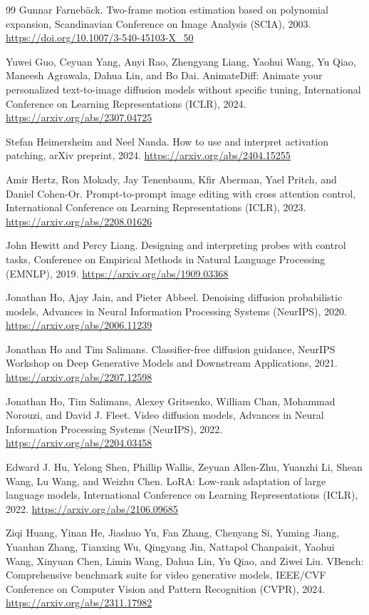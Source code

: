 \documentclass[twoside,english]{article}
\begin{document}
\begin{thebibliography}{99}
 Gunnar Farneb\"ack. Two-frame motion estimation based on polynomial expansion, Scandinavian Conference on Image Analysis (SCIA), 2003. \url{https://doi.org/10.1007/3-540-45103-X_50}

 Yuwei Guo, Ceyuan Yang, Anyi Rao, Zhengyang Liang, Yaohui Wang, Yu Qiao, Maneesh Agrawala, Dahua Lin, and Bo Dai. AnimateDiff: Animate your personalized text-to-image diffusion models without specific tuning, International Conference on Learning Representations (ICLR), 2024. \url{https://arxiv.org/abs/2307.04725}

 Stefan Heimersheim and Neel Nanda. How to use and interpret activation patching, arXiv preprint, 2024. \url{https://arxiv.org/abs/2404.15255}

 Amir Hertz, Ron Mokady, Jay Tenenbaum, Kfir Aberman, Yael Pritch, and Daniel Cohen-Or. Prompt-to-prompt image editing with cross attention control, International Conference on Learning Representations (ICLR), 2023. \url{https://arxiv.org/abs/2208.01626}

 John Hewitt and Percy Liang. Designing and interpreting probes with control tasks, Conference on Empirical Methods in Natural Language Processing (EMNLP), 2019. \url{https://arxiv.org/abs/1909.03368}

 Jonathan Ho, Ajay Jain, and Pieter Abbeel. Denoising diffusion probabilistic models, Advances in Neural Information Processing Systems (NeurIPS), 2020. \url{https://arxiv.org/abs/2006.11239}

 Jonathan Ho and Tim Salimans. Classifier-free diffusion guidance, NeurIPS Workshop on Deep Generative Models and Downstream Applications, 2021. \url{https://arxiv.org/abs/2207.12598}

 Jonathan Ho, Tim Salimans, Alexey Gritsenko, William Chan, Mohammad Norouzi, and David J. Fleet. Video diffusion models, Advances in Neural Information Processing Systems (NeurIPS), 2022. \url{https://arxiv.org/abs/2204.03458}

 Edward J. Hu, Yelong Shen, Phillip Wallis, Zeyuan Allen-Zhu, Yuanzhi Li, Shean Wang, Lu Wang, and Weizhu Chen. LoRA: Low-rank adaptation of large language models, International Conference on Learning Representations (ICLR), 2022. \url{https://arxiv.org/abs/2106.09685}

 Ziqi Huang, Yinan He, Jiashuo Yu, Fan Zhang, Chenyang Si, Yuming Jiang, Yuanhan Zhang, Tianxing Wu, Qingyang Jin, Nattapol Chanpaisit, Yaohui Wang, Xinyuan Chen, Limin Wang, Dahua Lin, Yu Qiao, and Ziwei Liu. VBench: Comprehensive benchmark suite for video generative models, IEEE/CVF Conference on Computer Vision and Pattern Recognition (CVPR), 2024. \url{https://arxiv.org/abs/2311.17982}


\end{thebibliography}
\end{document}
